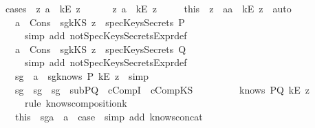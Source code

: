 \begin{isabellebody}
\ \ \isamarkupfalse \ {\isacharparenleft}cases\ {\isachardoublequoteopen}{\isasymexists}\ z{}{\isachardot}\ a\ {\isacharequal}\ kE\ z{}{\isachardoublequoteclose}{\isacharparenright}\isanewline
\ \ \ \ \isamarkupfalse \ {\isachardoublequoteopen}{\isasymexists}\ z{}{\isachardot}\ a\ {\isacharequal}\ {\isacharparenleft}kE\ z{}{\isacharparenright}{\isachardoublequoteclose}\isanewline
\ \ \ \ \isamarkupfalse \ this\ \isamarkupfalse \ z\ \ a{}{\isacharcolon}{\isachardoublequoteopen}a\ {\isacharequal}\ {\isacharparenleft}kE\ z{\isacharparenright}{\isachardoublequoteclose}\ \isamarkupfalse \ auto\isanewline
\ \ \ \ \isamarkupfalse \ a{}\ \ Cons\ \isamarkupfalse \ sg{}{\isacharcolon}{\isachardoublequoteopen}{\isacharparenleft}kKS\ z{\isacharparenright}\ {\isasymnotin}\ specKeysSecrets\ P{\isachardoublequoteclose}\isanewline
\ \ \ \ \ \ \isamarkupfalse \ {\isacharparenleft}simp\ add{\isacharcolon}\ notSpecKeysSecretsExpr{\isacharunderscore}def{\isacharparenright}\isanewline
\ \ \ \ \isamarkupfalse \ a{}\ \ Cons\ \isamarkupfalse \ sg{}{\isacharcolon}{\isachardoublequoteopen}{\isacharparenleft}kKS\ z{\isacharparenright}\ {\isasymnotin}\ specKeysSecrets\ Q{\isachardoublequoteclose}\ \isanewline
\ \ \ \ \ \ \isamarkupfalse \ {\isacharparenleft}simp\ add{\isacharcolon}\ notSpecKeysSecretsExpr{\isacharunderscore}def{\isacharparenright}\isanewline
\ \ \ \ \isamarkupfalse \ sg{}\ \ a{}\ \isamarkupfalse \ sg{}{\isacharcolon}{\isachardoublequoteopen}knows\ P\ {\isacharbrackleft}kE\ z{\isacharbrackright}{\isachardoublequoteclose}\ \isamarkupfalse \ simp\isanewline
\ \ \ \ \isamarkupfalse \ sg{}\ \ sg{}\ \ sg{}\ \ subPQ\ \ cCompI\ \ cCompKS\ \ \isanewline
\ \ \ \ \ \ \isamarkupfalse \ {\isachardoublequoteopen}knows\ PQ\ {\isacharbrackleft}kE\ z{\isacharbrackright}{\isachardoublequoteclose}\ \isanewline
\ \ \ \ \ \ \isamarkupfalse \ {\isacharparenleft}rule\ knows{\isacharunderscore}composition{}{\isacharunderscore}k{\isacharparenright}\isanewline
\ \ \ \ \isamarkupfalse \ this\ \ sg{}a\ \ a{}\ \isamarkupfalse \ {\isacharquery}case\ \isamarkupfalse \ {\isacharparenleft}simp\ add{\isacharcolon}\ knows{\isacharunderscore}concat{\isacharunderscore}{}{\isacharparenright}\isanewline

\end{isabellebody}
